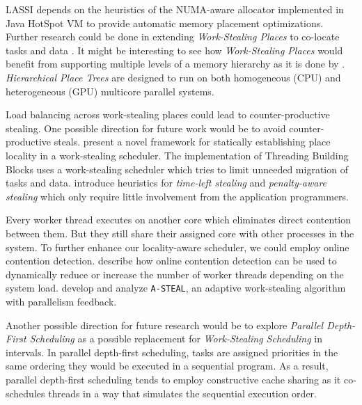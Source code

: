 LASSI depends on the heuristics of the NUMA-aware allocator
implemented in Java HotSpot VM to provide automatic memory placement
optimizations. Further research could be done in extending
\emph{Work-Stealing Places} to co-locate tasks and data \cite{HJ,
  Charles2005, Saraswat2010}. It might be interesting to see how
\emph{Work-Stealing Places} would benefit from supporting multiple
levels of a memory hierarchy as it is done by
\textcite{Yan2009}. \emph{Hierarchical Place Trees} are designed to
run on both homogeneous (CPU) and heterogeneous (GPU) multicore
parallel systems.

Load balancing across work-stealing places could lead to
counter-productive stealing. One possible direction for future work
would be to avoid counter-productive steals. \textcite{Agarwal2008}
present a novel framework for statically establishing place locality
in a work-stealing scheduler. The implementation of Threading Building
Blocks \cite{Contreras2008, Reinders2007} uses a work-stealing
scheduler which tries to limit unneeded migration of tasks and
data. \textcite{Gaud2010} introduce heuristics for \emph{time-left
  stealing} and \emph{penalty-aware stealing} which only require
little involvement from the application programmers.

Every worker thread executes on another core which eliminates direct
contention between them. But they still share their assigned core with
other processes in the system. To further enhance our locality-aware
scheduler, we could employ online contention
detection. \textcite{Mars2010} describe how online contention
detection can be used to dynamically reduce or increase the number of
worker threads depending on the system load. \textcite{Agrawal2007}
develop and analyze \lstinline!A-STEAL!, an adaptive work-stealing
algorithm with parallelism feedback.

Another possible direction for future research would be to explore
\emph{Parallel Depth-First Scheduling} as a possible replacement for
\emph{Work-Stealing Scheduling} in intervals. In parallel depth-first
scheduling, tasks are assigned priorities in the same ordering they
would be executed in a sequential program. As a result, parallel
depth-first scheduling tends to employ constructive cache sharing
\cite{Liaskovitis2006, Chen2007} as it co-schedules threads in a way
that simulates the sequential execution order.


